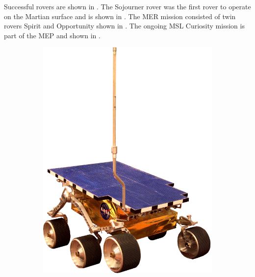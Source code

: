 Successful rovers are shown in . The Sojourner rover was the first rover to operate on the Martian surface and is shown in . The \ac{MER} mission consisted of twin rovers  Spirit and Opportunity shown in . The ongoing \ac{MSL} Curiosity mission is part of the \ac{MEP} and shown in .

\begin{figure}[h]
\captionsetup[subfigure]{justification=centering}
\vspace{-2ex}
	\centering
    \setlength{\subfigureWidth}{0.45\textwidth}
    \setlength{\graphicsHeight}{35mm}
    \hypersetup{hidelinks=true}%
	\begin{subfigure}[t]{\subfigureWidth}
        \centering
        \includegraphics[height=\graphicsHeight]{sections/state-of-the-art/past-missions/images/rover-sojourner.png}

\end{subfigure}
\end{figure}

